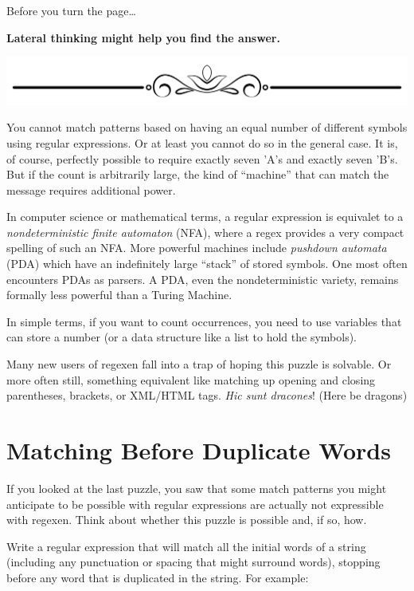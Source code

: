 Before you turn the page\ldots{}

\textbf{Lateral thinking might help you find the answer.}

\includegraphics{images/Elegant-Flourish-Frame-Extrapolated-19.svg}

\newpage

You cannot match patterns based on having an equal number of different
symbols using regular expressions. Or at least you cannot do so in the
general case. It is, of course, perfectly possible to require exactly
seven 'A's and exactly seven 'B's. But if the count is arbitrarily
large, the kind of ``machine'' that can match the message requires
additional power.

In computer science or mathematical terms, a regular expression is
equivalet to a \emph{nondeterministic finite automaton} (NFA), where a
regex provides a very compact spelling of such an NFA. More powerful
machines include \emph{pushdown automata} (PDA) which have an
indefinitely large ``stack'' of stored symbols. One most often
encounters PDAs as parsers. A PDA, even the nondeterministic variety,
remains formally less powerful than a Turing Machine.

In simple terms, if you want to count occurrences, you need to use
variables that can store a number (or a data structure like a list to
hold the symbols).

Many new users of regexen fall into a trap of hoping this puzzle is
solvable. Or more often still, something equivalent like matching up
opening and closing parentheses, brackets, or XML/HTML tags. \emph{Hic
sunt dracones}! (Here be dragons)

\newpage

\hypertarget{matching-before-duplicate-words}{%
\section{Matching Before Duplicate
Words}\label{matching-before-duplicate-words}}

If you looked at the last puzzle, you saw that some match patterns you
might anticipate to be possible with regular expressions are actually
not expressible with regexen. Think about whether this puzzle is
possible and, if so, how.

Write a regular expression that will match all the initial words of a
string (including any punctuation or spacing that might surround words),
stopping before any word that is duplicated in the string. For example:

